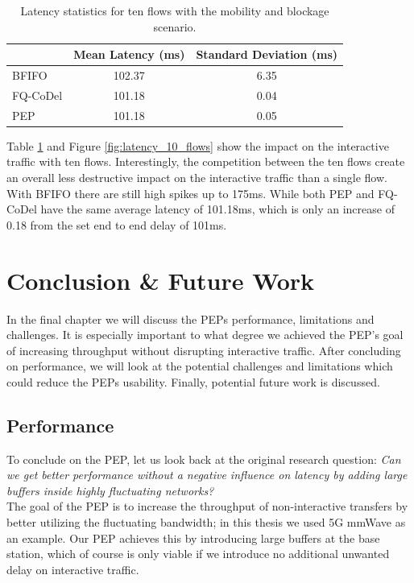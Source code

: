 \documentclass[a4paper,english, 11pt]{report}
\begin{document}
\begin{table}[h!]
\centering
\begin{tabular}{l|c|c}
\hline
 & \textbf{Mean Latency (ms)} & \textbf{Standard Deviation (ms)} \\
\hline
BFIFO   & 102.37 & 6.35 \\
FQ-CoDel  &  101.18 & 0.04 \\
PEP  &  101.18 & 0.05 \\
\end{tabular}
\caption{Latency statistics for ten flows with the mobility and blockage scenario.}
\label{tab:latency_10_flows}
\end{table}

Table \ref{tab:latency_10_flows} and Figure \ref{fig:latency_10_flows} show the impact on the interactive traffic with ten flows. Interestingly, the competition between the ten flows create an overall less destructive impact on the interactive traffic than a single flow. With BFIFO there are still high spikes up to 175ms. While both PEP and FQ-CoDel have the same average latency of 101.18ms, which is only an increase of 0.18 from the set end to end delay of 101ms.\\

\chapter{Conclusion \& Future Work}
In the final chapter we will discuss the PEPs performance, limitations and challenges. It is especially important to what degree we achieved the PEP's goal of increasing throughput without disrupting interactive traffic. After concluding on performance, we will look at the potential challenges and limitations which could reduce the PEPs usability. Finally, potential future work is discussed.\\

\section{Performance}
To conclude on the PEP, let us look back at the original research question: \textit{Can we get better performance without a negative influence on latency by adding large buffers inside highly fluctuating networks?}\\

The goal of the PEP is to increase the throughput of non-interactive transfers by better utilizing the fluctuating bandwidth; in this thesis we used 5G mmWave as an example. Our PEP achieves this by introducing large buffers at the base station, which of course is only viable if we introduce no additional unwanted delay on interactive traffic.\\
\end{document}
